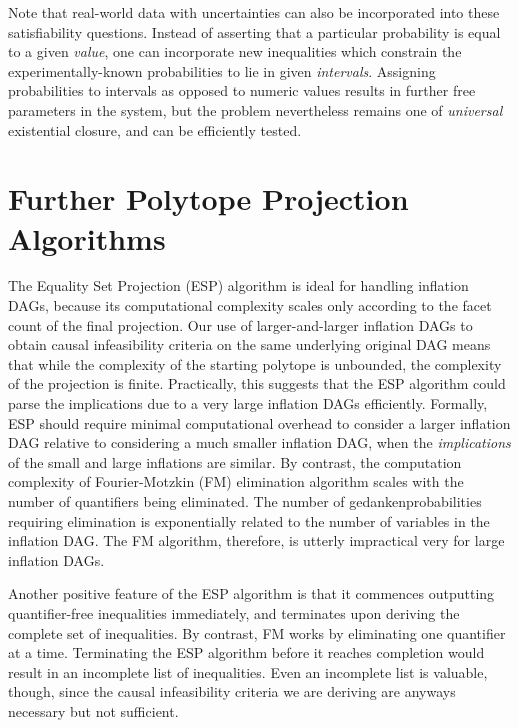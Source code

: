 {Note that real-world data with uncertainties can also be incorporated into these satisfiability questions. Instead of asserting that a particular probability is equal to a given \emph{value}, one can incorporate new inequalities which constrain the experimentally-known probabilities to lie in given \emph{intervals}. Assigning probabilities to intervals as opposed to numeric values results in further free parameters in the system, but the problem nevertheless remains one of \emph{universal} existential closure, and can be efficiently tested.




\section{Further Polytope Projection Algorithms}\label{sec:projalgorithms}

The Equality Set Projection (ESP) algorithm \cite{jones2004equality,JonesThesis2005} is ideal for handling inflation DAGs, because its computational complexity scales only according to the facet count of the final projection. Our use of larger-and-larger inflation DAGs to obtain causal infeasibility criteria on the same underlying original DAG means that while the complexity of the starting polytope is unbounded, the complexity of the projection is finite. Practically, this suggests that the ESP algorithm could parse the implications due to a very large inflation DAGs efficiently. Formally, ESP should require minimal computational overhead to consider a larger inflation DAG relative to considering a much smaller inflation DAG, when the \emph{implications} of the small and large inflations are similar. By contrast, the computation complexity of Fourier-Motzkin (FM) elimination algorithm scales with the number of quantifiers being eliminated. The number of gedankenprobabilities requiring elimination is exponentially related to the number of variables in the inflation DAG. The FM algorithm, therefore, is utterly impractical very for large inflation DAGs.

Another positive feature of the ESP algorithm is that it commences outputting quantifier-free inequalities immediately, and terminates upon deriving the complete set of inequalities. By contrast, FM works by eliminating one quantifier at a time. Terminating the ESP algorithm before it reaches completion would result in an incomplete list of inequalities. Even an incomplete list is valuable, though, since the causal infeasibility criteria we are deriving are anyways necessary but not sufficient.

}
